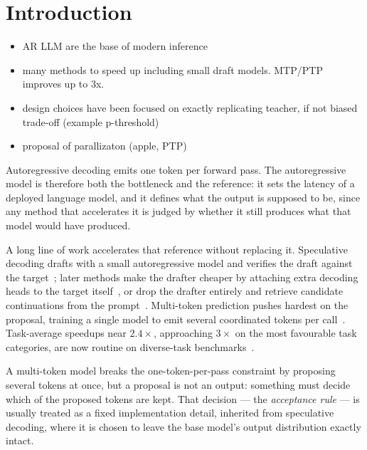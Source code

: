 \documentclass{article} %
\makeatletter
\newenvironment{ai}
  {\color{lightgray}%
   \@ifpackageloaded{caption}{\captionsetup{font={color=lightgray}}}{}%
   \let\ai@savedfloatreset\@floatboxreset
   \g@addto@macro\@floatboxreset{\color{lightgray}}}
  {\global\let\@floatboxreset\ai@savedfloatreset}
\makeatother
\begin{document}
\begin{ai}
\section{Introduction}

\begin{itemize}
    \item AR LLM are the base of modern inference
    \item many methods to speed up including small draft models. MTP/PTP improves up to 3x.
    \item design choices have been focused on exactly replicating teacher, if not biased trade-off (example p-threshold)
    \item proposal of parallizaton (apple, PTP)
\end{itemize}

Autoregressive decoding emits one token per forward pass. The autoregressive
model is therefore both the bottleneck and the reference: it sets the latency of
a deployed language model, and it defines what the output is supposed to be,
since any method that accelerates it is judged by whether it still produces what
that model would have produced.

A long line of work accelerates that reference without replacing it. Speculative
decoding drafts with a small autoregressive model and verifies the draft against
the target~\citep{leviathan2023speculative,chen2023accelerating}; later methods
make the drafter cheaper by attaching extra decoding heads to the target
itself~\citep{stern2018blockwise,cai2024medusa,ankner2024hydra,li2024eagle}, or
drop the drafter entirely and retrieve candidate continuations from the
prompt~\citep{saxena2023pld}. Multi-token prediction pushes hardest on the
proposal, training a single model to emit several coordinated tokens per
call~\citep{gloeckle2024multitoken,draxler2025ptp}. Task-average speedups near
$2.4\times$, approaching $3\times$ on the most favourable task categories, are
now routine on diverse-task benchmarks~\citep{xia2024specbench}.

A multi-token model breaks the one-token-per-pass constraint by proposing several
tokens at once, but a proposal is not an output: something must decide which of
the proposed tokens are kept. That decision --- the \emph{acceptance rule} --- is
usually treated as a fixed implementation detail, inherited from speculative
decoding, where it is chosen to leave the base model's output distribution
exactly intact.


\end{ai}
\end{document}
